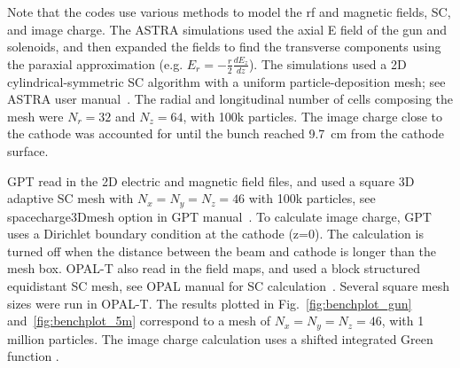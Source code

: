 \documentclass{iitthesis}
\begin{document}
Note that the codes use various methods to model 
the rf and magnetic fields, SC, and image charge. 
The ASTRA simulations used the axial E field of the  
gun and solenoids, and then expanded the fields to find the
transverse components using the paraxial approximation 
(e.g. $E_r=-\frac{r}{2}\frac{dE_z}{dz}$). 
The simulations used a 2D cylindrical-symmetric SC algorithm with a uniform  
particle-deposition mesh; see ASTRA user manual~\cite{astra}.
The radial and longitudinal number of cells composing the mesh 
were $N_r=32$ and $N_z=64$, with 100k particles.  
The image charge close to the cathode was accounted for until 
the bunch reached \SI{9.7}{cm} from the cathode surface. 

GPT read in the 2D electric and magnetic field files,  
and used a square 3D adaptive SC mesh with $N_x=N_y=N_z=46$
with 100k particles, see spacecharge3Dmesh option in GPT manual~\cite{gpt}.
To calculate image charge, GPT uses a Dirichlet boundary condition at the  
cathode (z=0). The calculation is turned off when the  
distance between the beam and cathode is longer than the 
mesh box. OPAL-T also read in the field maps, and used a block 
structured equidistant SC mesh, see OPAL manual for SC calculation~\cite{opal}.  
Several square mesh sizes were run in OPAL-T. The results plotted in 
Fig.~\ref{fig:benchplot_gun} and~\ref{fig:benchplot_5m} correspond to a mesh of $N_x=N_y=N_z=46$, with 1 million particles. 
The image charge calculation uses a 
shifted integrated Green function \cite{imagecharge}.  
\end{document}

